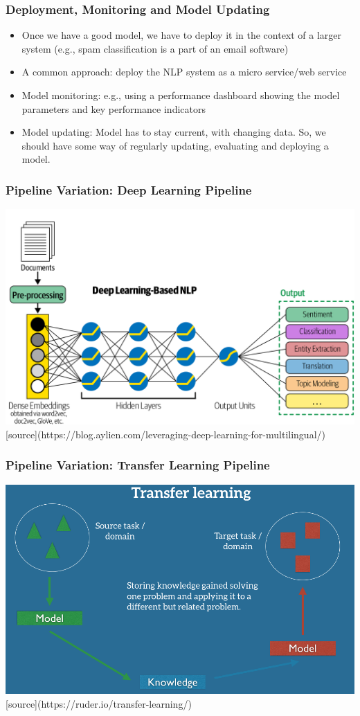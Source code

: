 \documentclass{beamer}
\begin{document}
\begin{frame}
\frametitle{Deployment, Monitoring and Model Updating}
\begin{itemize}
    \item Once we have a good model, we have to deploy it in the context of a larger system (e.g., spam classification is a part of an email software)
\item A common approach: deploy the NLP system as a micro service/web service
\item Model monitoring: e.g., using a performance dashboard showing the model parameters and key performance indicators
\item Model updating: Model has to stay current, with changing data. So, we should have some way of regularly updating, evaluating and deploying a model.
\end{itemize}
\end{frame}

\begin{frame}
\frametitle{Pipeline Variation: Deep Learning Pipeline}
\includegraphics[width=\textwidth]{figures/nlppipelinedl.png}
[source](https://blog.aylien.com/leveraging-deep-learning-for-multilingual/)
\end{frame}


\begin{frame}
\frametitle{Pipeline Variation: Transfer Learning Pipeline}
\includegraphics[width=\textwidth]{figures/tl.png}
[source](https://ruder.io/transfer-learning/)
\end{frame}
\end{document}

